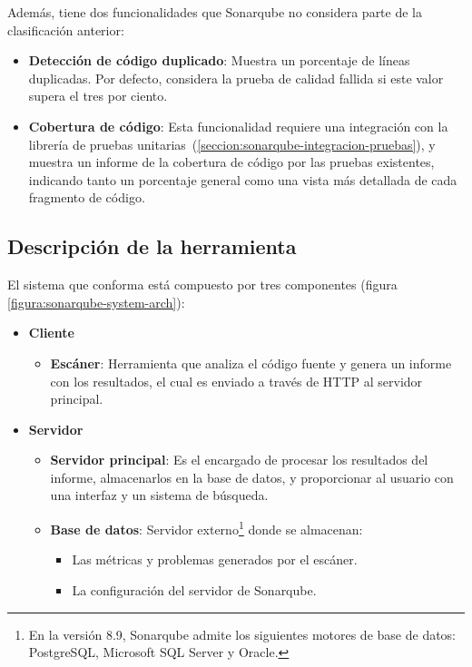 \documentclass[11pt,spanish,listoffigures,listoftables,table,hyphens,dvipsnames]{tfgetsinf}
\newcommand{\fe}[1]{\foreign{english}{#1}}
\begin{document}
Además, tiene dos funcionalidades que Sonarqube no considera parte de la clasificación anterior:

\begin{itemize}
   \item \textbf{Detección de código duplicado}: Muestra un porcentaje de líneas duplicadas. Por defecto, considera la prueba de calidad fallida si este valor supera el tres por ciento.
   \item \textbf{Cobertura de código}: Esta funcionalidad requiere una integración con la librería de pruebas unitarias~(\ref{seccion:sonarqube-integracion-pruebas}), y muestra un informe de la cobertura de código por las pruebas existentes, indicando tanto un porcentaje general como una vista más detallada de cada fragmento de código.
\end{itemize}

\subsection{Descripción de la herramienta}%

El sistema que conforma \textbf{\fe{Sonarqube}} está compuesto por tres componentes (figura \ref{figura:sonarqube-system-arch}):

\begin{itemize}
   \item \textbf{Cliente}
      \begin{itemize}
         \item \textbf{Escáner}: Herramienta que analiza el código fuente y genera un informe con los resultados, el cual es enviado a través de HTTP al servidor principal.
      \end{itemize}
   \item \textbf{Servidor}
      \begin{itemize}
         \item \textbf{Servidor principal}: Es el encargado de procesar los resultados del informe, almacenarlos en la base de datos, y proporcionar al usuario con una interfaz y un sistema de búsqueda.
         \item \textbf{Base de datos}:
            Servidor externo\footnote{En la versión 8.9, Sonarqube admite los siguientes motores de base de datos: PostgreSQL, Microsoft SQL Server y Oracle.} donde se almacenan:
            \begin{itemize}
               \item Las métricas y problemas generados por el escáner.
               \item La configuración del servidor de Sonarqube.
            \end{itemize}
      \end{itemize}
\end{itemize}
\end{document}

